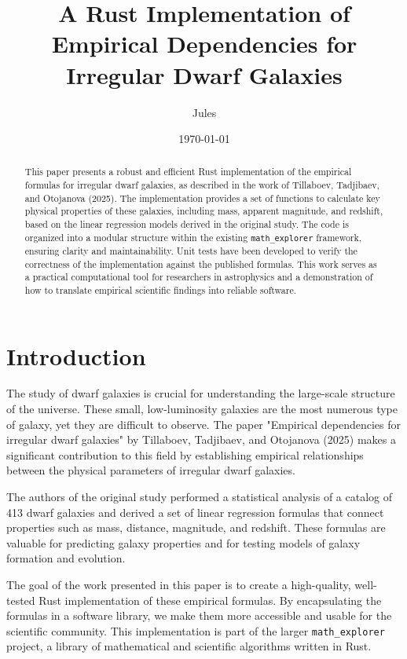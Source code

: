 \documentclass{article}
\title{A Rust Implementation of Empirical Dependencies for Irregular Dwarf Galaxies}
\author{Jules}
\date{\today}
\begin{document}
\maketitle

\begin{abstract}
This paper presents a robust and efficient Rust implementation of the empirical formulas for irregular dwarf galaxies, as described in the work of Tillaboev, Tadjibaev, and Otojanova (2025). The implementation provides a set of functions to calculate key physical properties of these galaxies, including mass, apparent magnitude, and redshift, based on the linear regression models derived in the original study. The code is organized into a modular structure within the existing \texttt{math_explorer} framework, ensuring clarity and maintainability. Unit tests have been developed to verify the correctness of the implementation against the published formulas. This work serves as a practical computational tool for researchers in astrophysics and a demonstration of how to translate empirical scientific findings into reliable software.
\end{abstract}

\section{Introduction}

The study of dwarf galaxies is crucial for understanding the large-scale structure of the universe. These small, low-luminosity galaxies are the most numerous type of galaxy, yet they are difficult to observe. The paper "Empirical dependencies for irregular dwarf galaxies" by Tillaboev, Tadjibaev, and Otojanova (2025) makes a significant contribution to this field by establishing empirical relationships between the physical parameters of irregular dwarf galaxies.

The authors of the original study performed a statistical analysis of a catalog of 413 dwarf galaxies and derived a set of linear regression formulas that connect properties such as mass, distance, magnitude, and redshift. These formulas are valuable for predicting galaxy properties and for testing models of galaxy formation and evolution.

The goal of the work presented in this paper is to create a high-quality, well-tested Rust implementation of these empirical formulas. By encapsulating the formulas in a software library, we make them more accessible and usable for the scientific community. This implementation is part of the larger \texttt{math_explorer} project, a library of mathematical and scientific algorithms written in Rust.
\end{document}
